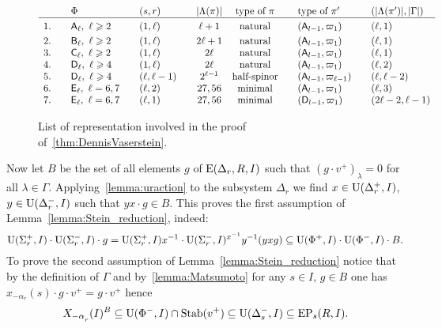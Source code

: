 \begin{figure}
\[\begin{array}{l @{\qquad} l @{\qquad} l @{\qquad} c @{\quad} c @{\qquad} l @{\qquad} l}
   & \Phi                                 & (s,r)         & |\Lambda(\pi)| & \text{type of $\pi$} & \text{type of $\pi'$}        & (|\Lambda(\pi')|, |\Gamma|)  \\ \hline\vphantom{\Bigl(}
1. & \rA_\ell,\ \ell\geqslant 2           & (1,\ell)      & \ell+1         & \text{natural}       & (\rA_{l-1}, \varpi_1)        & (\ell,1)  \\     
2. & \rB_\ell,\ \ell\geqslant 2           & (1,\ell)      & 2\ell+1        & \text{natural}       & (\rA_{l-1}, \varpi_1)        & (\ell,1) \\     
3. & \rC_\ell,\ \ell\geqslant 2           & (1,\ell)      & 2\ell          & \text{natural}       & (\rA_{l-1}, \varpi_1)        & (\ell,1)  \\
4. & \rD_\ell,\ \ell\geqslant 4           & (1,\ell)      & 2\ell          & \text{natural}       & (\rA_{l-1}, \varpi_1)        & (\ell,2)  \\ 
5. & \rD_\ell,\ \ell\geqslant 4           & (\ell,\ell-1) & 2^{\ell-1}     & \text{half-spinor}   & (\rA_{l-1}, \varpi_{\ell-1}) & (\ell,\ell-2)  \\
6. & \rE_\ell,\ \ell=6,7                  & (\ell,2)      & 27, 56         & \text{minimal}       & (\rA_{l-1}, \varpi_1)        & (\ell,3)  \\ 
7. & \rE_\ell,\ \ell=6,7                  & (\ell,1)      & 27, 56         & \text{minimal}       & (\rD_{l-1}, \varpi_1)        & (2\ell-2,\ell-1)  \end{array}\]
 \caption[Table]{List of representation involved in the proof of~\cref{thm:DennisVaserstein}.} \label{fig:table}
\end{figure}

Now let $B$ be the set of all elements $g$ of $\operatorname{E}(\Delta_r,R, I)$ such that $(g \cdot v^+)_\lambda = 0$ for all $\lambda\in\Gamma$.
Applying~\cref{lemma:uraction} to the subsystem $\Delta_r$ we find
$x\in\operatorname{U}(\Delta_r^+, I)$, $y\in \operatorname{U}(\Delta_r^-, I)$ such that $yx\cdot g \in B$.
This proves the first assumption of Lemma~\ref{lemma:Stein_reduction}, indeed:
\[ \operatorname{U}(\Sigma^+_r, I) \cdot \operatorname{U}(\Sigma^-_r, I) \cdot g = \operatorname{U}(\Sigma^+_r, I) x^{-1} \cdot \operatorname{U}(\Sigma^-_r, I)^{x^{-1}} y^{-1} (yxg) \subseteq \operatorname{U}(\Phi^+, I) \cdot \operatorname{U}(\Phi^-, I) \cdot B. \]
To prove the second assumption of Lemma~\ref{lemma:Stein_reduction} notice that by the definition of $\Gamma$ and by~\cref{lemma:Matsumoto} for any $s\in I$, $ g\in B$ one has $x_{-\alpha_r}(s) \cdot g \cdot v^+ = g \cdot v^+$ hence
\[ X_{-\alpha\ssub{r}}(I)^{B} \subseteq \U(\Phi^-, I) \cap \Stab(v^+) \subseteq \U(\Delta_s^-, I) \subseteq \EP_s(R, I). \]

